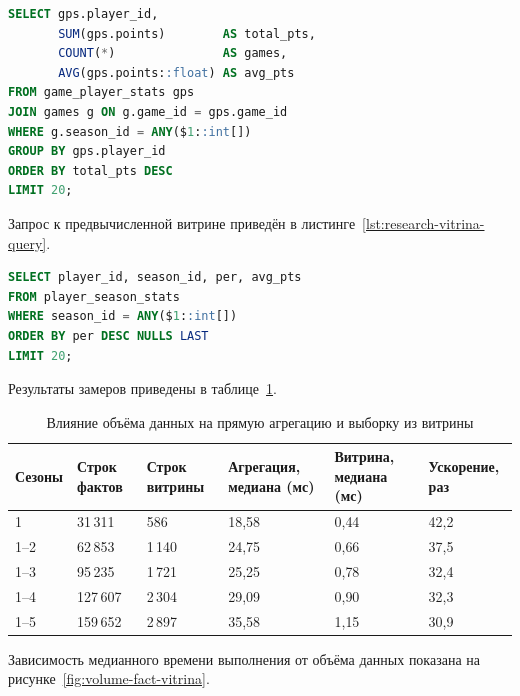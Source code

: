 \begin{lstlisting}[language=SQL, label=lst:research-heavy-agg,
  caption=Прямой агрегирующий запрос к таблице фактов]
SELECT gps.player_id,
       SUM(gps.points)        AS total_pts,
       COUNT(*)               AS games,
       AVG(gps.points::float) AS avg_pts
FROM game_player_stats gps
JOIN games g ON g.game_id = gps.game_id
WHERE g.season_id = ANY($1::int[])
GROUP BY gps.player_id
ORDER BY total_pts DESC
LIMIT 20;
\end{lstlisting}

Запрос к предвычисленной витрине приведён
в листинге~\ref{lst:research-vitrina-query}.

\begin{lstlisting}[language=SQL, label=lst:research-vitrina-query,
  caption=Запрос к предвычисленной витрине]
SELECT player_id, season_id, per, avg_pts
FROM player_season_stats
WHERE season_id = ANY($1::int[])
ORDER BY per DESC NULLS LAST
LIMIT 20;
\end{lstlisting}

Результаты замеров приведены в таблице~\ref{tab:volume-fact-vitrina}.

\begin{table}[H]
\caption{Влияние объёма данных на прямую агрегацию и выборку из витрины}
\label{tab:volume-fact-vitrina}
\centering
\small
\begin{tabular}{|p{}|p{}|p{}
  |p{}|p{}|p{}|}
\hline
\textbf{Сезоны} & \textbf{Строк фактов} & \textbf{Строк витрины}
  & \textbf{Агрегация, медиана (мс)} & \textbf{Витрина, медиана (мс)}
  & \textbf{Ускорение, раз} \\
\hline
1       & 31\,311  & 586   & 18{,}58 & 0{,}44 & 42{,}2 \\
\hline
1--2    & 62\,853  & 1\,140 & 24{,}75 & 0{,}66 & 37{,}5 \\
\hline
1--3    & 95\,235  & 1\,721 & 25{,}25 & 0{,}78 & 32{,}4 \\
\hline
1--4    & 127\,607 & 2\,304 & 29{,}09 & 0{,}90 & 32{,}3 \\
\hline
1--5    & 159\,652 & 2\,897 & 35{,}58 & 1{,}15 & 30{,}9 \\
\hline
\end{tabular}
\end{table}

Зависимость медианного времени выполнения от объёма данных показана
на рисунке~\ref{fig:volume-fact-vitrina}.

